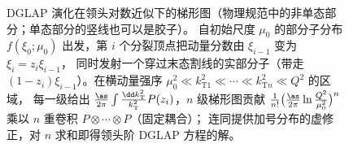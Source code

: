 \begin{figure}[htbp]
\caption{DGLAP 演化在领头对数近似下的梯形图（物理规范中的非单态部分；单态部分的竖线也可以是胶子）。
自初始尺度 $\mu_0$ 的部分子分布 $f(\xi_0;\mu_0)$ 出发，第 $i$ 个分裂顶点把动量分数由 $\xi_{i-1}$ 变为 $\xi_i=z_i\xi_{i-1}$，
同时发射一个穿过末态割线的实部分子（带走 $(1-z_i)\xi_{i-1}$）。在横动量强序 $\mu_0^2\ll k_{\mathrm T1}^2\ll\cdots\ll k_{\mathrm Tn}^2\ll Q^2$ 的区域，
每一级给出 $\frac{\as}{2\pi}\int\frac{\dd k_{\mathrm T}^2}{k_{\mathrm T}^2}P(z_i)$，$n$ 级梯形图贡献 $\frac{1}{n!}\big(\frac{\as}{2\pi}\ln\frac{Q^2}{\mu_0^2}\big)^n$ 乘以 $n$ 重卷积 $P\otimes\cdots\otimes P$（固定耦合）；
连同提供加号分布的虚修正，对 $n$ 求和即得领头阶 DGLAP 方程的解。}
\label{fig:dglap-ladder}
\end{figure}

